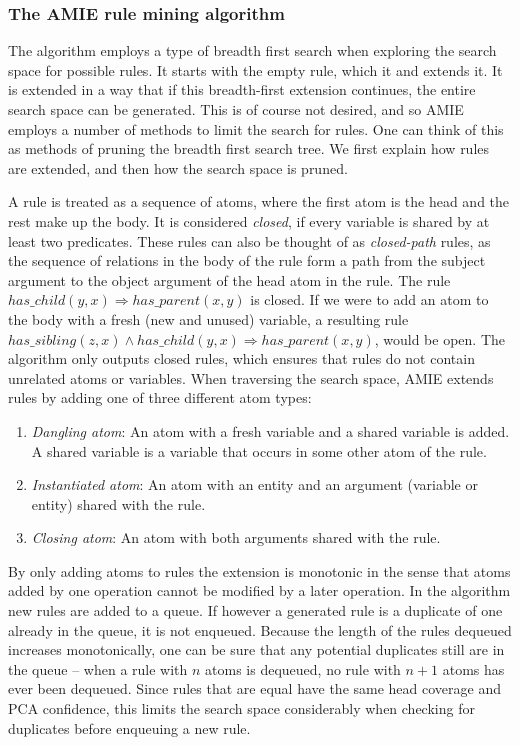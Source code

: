 \subsubsection{The AMIE rule mining algorithm}
The algorithm employs a type of breadth first search when exploring the search space for possible rules. It starts with the empty rule, which it and extends it. It is extended in a way that if this breadth-first extension continues, the entire search space can be generated. This is of course not desired, and so AMIE employs a number of methods to limit the search for rules. One can think of this as methods of pruning the breadth first search tree. We first explain how rules are extended, and then how the search space is pruned.

A rule is treated as a sequence of atoms, where the first atom is the head and the rest make up the body. It is considered \textit{closed}, if every variable is shared by at least two predicates. These rules can also be thought of as \textit{closed-path} rules, as the sequence of relations in the body of the rule form a path from the subject argument to the object argument of the head atom in the rule. The rule $has\_child(y, x) \Rightarrow has\_parent(x, y)$ is closed. If we were to add an atom to the body with a fresh (new and unused) variable, a resulting rule $has\_sibling(z, x) \wedge has\_child(y, x) \Rightarrow has\_parent(x, y)$, would be open. The algorithm only outputs closed rules, which ensures that rules do not contain unrelated atoms or variables. When traversing the search space, AMIE extends rules by adding one of three different atom types:
\begin{enumerate}
    \item \textit{Dangling atom}: An atom with a fresh variable and a shared variable is added. A shared variable is a variable that occurs in some other atom of the rule.
    \item \textit{Instantiated atom}: An atom with an entity and an argument (variable or entity) shared with the rule.
    \item \textit{Closing atom}: An atom with both arguments shared with the rule.
\end{enumerate}

By only adding atoms to rules the extension is monotonic in the sense that atoms added by one operation cannot be modified by a later operation. In the algorithm new rules are added to a queue. If however a generated rule is a duplicate of one already in the queue, it is not enqueued. Because the length of the rules dequeued increases monotonically, one can be sure that any potential duplicates still are in the queue -- when a rule with $n$ atoms is dequeued, no rule with $n+1$ atoms has ever been dequeued. Since rules that are equal have the same head coverage and PCA confidence, this limits the search space considerably when checking for duplicates before enqueuing a new rule.

